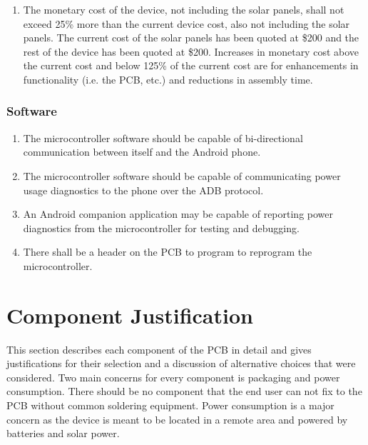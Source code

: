 \documentclass{article}
\numberwithin{figure}{section}
\numberwithin{equation}{section}
\begin{document}
{\begin{enumerate}[align=left,leftmargin=*, labelindent= 0em, label=\textbf{Requirement \thesubsubsection.\arabic*.}, itemindent=0em]
\item \label{HW4} The monetary cost of the device, not including the solar panels, shall not exceed 25\% more than the current device cost, also not including the solar panels. The current cost of the solar panels has been quoted at \$200 and the rest of the device has been quoted at \$200. Increases in monetary cost above the current cost and below 125\% of the current cost are for enhancements in functionality (i.e. the PCB, etc.) and reductions in assembly time.

\end{enumerate}
\subsubsection{Software} \label{sect:software2}
\begin{enumerate}[align=left,leftmargin=*, labelindent= 0em, label=\textbf{Requirement \thesubsubsection.\arabic*.}, itemindent=0em]
\item \label{SW1}The microcontroller software should be capable of bi-directional communication between itself and the Android phone.
\item \label{SW2}The microcontroller software should be capable of communicating power usage diagnostics to the phone over the ADB protocol.
\item \label{SW3}An Android companion application may be capable of reporting power diagnostics from the microcontroller for testing and debugging.
\item \label{SW4}There shall be a header on the PCB to program to reprogram the microcontroller.
\end{enumerate}

\section{Component Justification} \label{sect:justification}
This section describes each component of the PCB in detail and gives justifications for their selection and a discussion of alternative choices that were considered. Two main concerns for every component is packaging and power consumption. There should be no component that the end user can not fix to the PCB without common soldering equipment. Power consumption is a major concern as the device is meant to be located in a remote area and powered by batteries and solar power.

}
\end{document}
